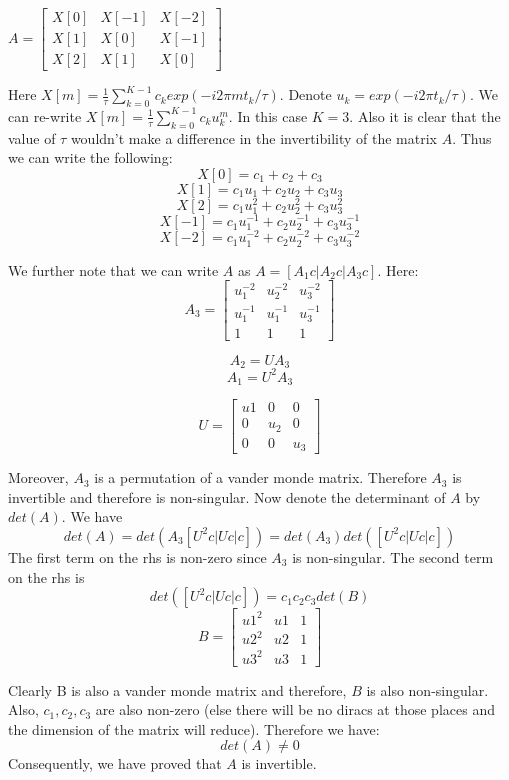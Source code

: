 \documentclass{article}
\begin{document}
$A = \begin{bmatrix}
X[0] & X[-1] & X[-2]\\
X[1] & X[0] & X[-1]\\
X[2] & X[1] & X[0]
\end{bmatrix}$

Here $X[m] = \frac{1}{\tau} \sum_{k=0}^{K-1} c_k exp(-i 2 \pi m t_k / \tau)$. Denote $u_k = exp(-i 2\pi t_k / \tau)$. We can re-write $X[m] = \frac{1}{\tau} \sum_{k=0}^{K-1}c_k u_k^m$. In this case $K=3$. Also it is clear that the value of $\tau$ wouldn't make a difference in the invertibility of the matrix $A$. Thus we can write the following:
$$X[0] = c_1 + c_2 + c_3$$
$$X[1] = c_1u_1 + c_2 u_2 + c_3 u_3$$
$$X[2] = c_1 u_1^2 + c_2 u_2^2 + c_3u_3^2$$
$$X[-1] = c_1 u_1^{-1} + c_2 u_2^{-1} + c_3 u_3^{-1}$$
$$X[-2] = c_1 u_1^{-2} + c_2 u_2^{-2} + c_3 u_3^{-2}$$

We further note that we can write $A$ as $A = [A_1c | A_2c | A_3c]$. Here:
$$A_3 = \begin{bmatrix}
u_1^{-2} & u_2^{-2} & u_3^{-2}\\
u_1^{-1} & u_1^{-1} & u_3^{-1}\\
 1 &  1 & 1
\end{bmatrix}$$

$$A_2 = UA_3$$
$$A_1 = U^2 A_3$$

$$U = \begin{bmatrix}
u1 & 0 & 0\\
0 & u_2 & 0\\
0 & 0 & u_3
\end{bmatrix}$$

Moreover, $A_3$ is a permutation of a vander monde matrix. Therefore $A_3$ is invertible and therefore is non-singular. Now denote the determinant of $A$ by $det(A)$. We have
$$det(A) = det(A_3 [U^2c | Uc | c]) = det(A_3) det([U^2c | Uc | c])$$
The first term on the rhs is non-zero since $A_3$ is non-singular. The second term on the rhs is
$$det([U^2c | Uc | c]) = c_1 c_2 c_3 det(B)$$
$$B = \begin{bmatrix}
u1^2 & u1 & 1\\
u2^2 & u2 & 1\\
u3^2 & u3 & 1
\end{bmatrix}$$

Clearly B is also a vander monde matrix and therefore, $B$ is also non-singular. Also, $c_1, c_2, c_3$ are also non-zero (else there will be no diracs at those places and the dimension of the matrix will reduce). Therefore we have:
$$det(A) \ne 0$$
Consequently, we have proved that $A$ is invertible.
\end{document}
